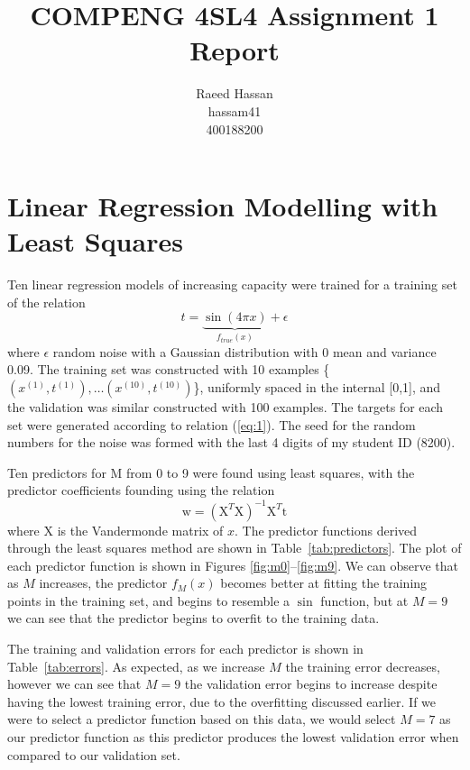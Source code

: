 \documentclass[12pt]{article}
\title{COMPENG 4SL4 Assignment 1 Report}
\author{
    Raeed Hassan \\
    hassam41 \\
    400188200
}
\begin{document}
\maketitle
\clearpage

\section*{Linear Regression Modelling with Least Squares}
Ten linear regression models of increasing capacity were trained for a training set of the relation
\begin{equation}
    t = \underbrace{\sin(4 \pi x)}_{f_{true}(x)} + \epsilon
    \label{eq:1}
\end{equation}
where $\epsilon$ random noise with a Gaussian distribution with 0 mean and variance 0.09. The training set was constructed with 10 examples \{${(x^{(1)},t^{(1)}),\dots(x^{(10)},t^{(10)})}$\}, uniformly spaced in the internal [0,1], and the validation was similar constructed with 100 examples. The targets for each set were generated according to relation (\ref{eq:1}). The seed for the random numbers for the noise was formed with the last 4 digits of my student ID (8200).

Ten predictors for M from 0 to 9 were found using least squares, with the predictor coefficients founding using the relation
\begin{equation}
    \text{w} = (\text{X}^T \text{X})^{-1} \text{X}^T \text{t}
    \label{eq:2}
\end{equation}
where X is the Vandermonde matrix of $x$. The predictor functions derived through the least squares method are shown in Table~\ref{tab:predictors}. The plot of each predictor function is shown in Figures \ref{fig:m0}--\ref{fig:m9}. We can observe that as $M$ increases, the predictor $f_M(x)$ becomes better at fitting the training points in the training set, and begins to resemble a $\sin$ function, but at $M = 9$ we can see that the predictor begins to overfit to the training data.

The training and validation errors for each predictor is shown in Table~\ref{tab:errors}. As expected, as we increase $M$ the training error decreases, however we can see that $M = 9$ the validation error begins to increase despite having the lowest training error, due to the overfitting discussed earlier. If we were to select a predictor function based on this data, we would select $M = 7$ as our predictor function as this predictor produces the lowest validation error when compared to our validation set.  
\end{document}
